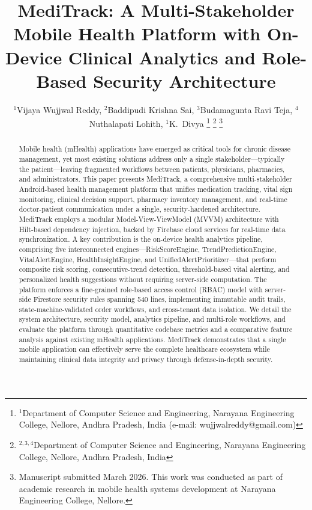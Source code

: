\documentclass[journal,onecolumn,web]{ieeecolor}
\begin{document}
\title{MediTrack: A Multi-Stakeholder Mobile Health
Platform with On-Device Clinical Analytics and
Role-Based Security Architecture}
\author{$^{1}$Vijaya Wujjwal Reddy, $^{2}$Baddipudi Krishna Sai, $^{3}$Budamagunta Ravi Teja, $^{4}$Nuthalapati Lohith, $^{1}$K.~Divya
\thanks{$^{1}$Department of Computer Science and Engineering, Narayana Engineering College, Nellore, Andhra Pradesh, India (e-mail: wujjwalreddy@gmail.com)}
\thanks{$^{2,3,4}$Department of Computer Science and Engineering, Narayana Engineering College, Nellore, Andhra Pradesh, India}
\thanks{Manuscript submitted March 2026. This work was conducted as part of academic research in mobile health systems development at Narayana Engineering College, Nellore.}}

\maketitle
\thispagestyle{empty}

\begin{abstract}
Mobile health (mHealth) applications have emerged as
critical tools for chronic disease management, yet most
existing solutions address only a single
stakeholder---typically the patient---leaving fragmented
workflows between patients, physicians, pharmacies, and
administrators. This paper presents MediTrack, a
comprehensive multi-stakeholder Android-based health
management platform that unifies medication tracking,
vital sign monitoring, clinical decision support,
pharmacy inventory management, and real-time
doctor-patient communication under a single,
security-hardened architecture. MediTrack employs a
modular Model-View-ViewModel (MVVM) architecture with
Hilt-based dependency injection, backed by Firebase
cloud services for real-time data synchronization. A key
contribution is the on-device health analytics pipeline,
comprising five interconnected
engines---RiskScoreEngine, TrendPredictionEngine,
VitalAlertEngine, HealthInsightEngine, and
UnifiedAlertPrioritizer---that perform composite risk
scoring, consecutive-trend detection, threshold-based
vital alerting, and personalized health suggestions
without requiring server-side computation. The platform
enforces a fine-grained role-based access control (RBAC)
model with server-side Firestore security rules spanning
540 lines, implementing immutable audit trails,
state-machine-validated order workflows, and
cross-tenant data isolation. We detail the system
architecture, security model, analytics pipeline, and
multi-role workflows, and evaluate the platform through
quantitative codebase metrics and a comparative feature
analysis against existing mHealth applications.
MediTrack demonstrates that a single mobile application
can effectively serve the complete healthcare ecosystem
while maintaining clinical data integrity and privacy
through defense-in-depth security.
\end{abstract}
\end{document}
